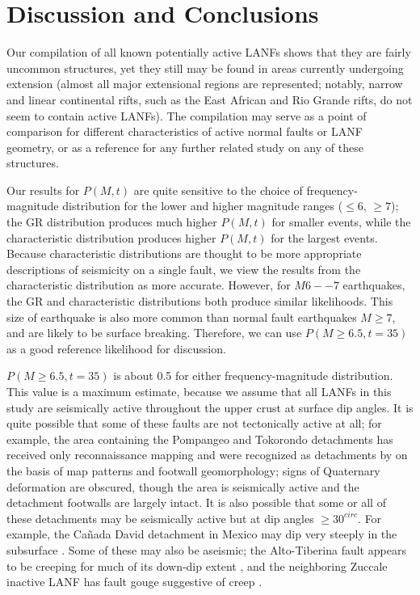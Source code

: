 \documentclass[draft,grl]{AGUTeX}
\begin{document}
\begin{article}
\begin{figure}
\label{fig:all_probs}
\end{figure}

\section{Discussion and Conclusions}

Our compilation of all known potentially active LANFs shows that they 
are fairly uncommon structures, yet they still may be found in areas 
currently undergoing extension (almost all major extensional regions are
represented; notably, narrow and linear continental rifts, such as 
the East African and Rio Grande rifts, do not seem to contain active LANFs).
The compilation may serve as a point of comparison for different
characteristics of active normal faults or LANF geometry, or as a
reference for any further related study on any of these structures.

Our results for $P(M,t)$ are quite sensitive to the choice of frequency-
magnitude distribution for the lower and higher magnitude ranges ($\le 6, \,
\ge 7$); the GR distribution produces much higher $P(M,t)$ for smaller events,
while the characteristic distribution produces higher $P(M,t)$ for the largest
events.  Because characteristic distributions are thought to be more
appropriate descriptions of seismicity on a single fault, we view the results
from the characteristic distribution as more accurate.
However, for $M6--7$ earthquakes, the GR and characteristic 
distributions both produce similar likelihoods.  This size of earthquake is
also more common than normal fault earthquakes $M\ge 7$, and are likely to be
surface breaking.  Therefore, we can use $P(M\ge6.5, t=35)$ as a good reference
likelihood for discussion.

$P(M\ge6.5, t=35)$ is about 0.5 for either frequency-magnitude distribution.
This value is a maximum estimate, because we assume that all LANFs in this
study are seismically active throughout the upper crust at surface dip angles.
It is quite possible that some of these faults are not tectonically active
at all; for example, the area containing the Pompangeo and Tokorondo
detachments has received only reconnaissance mapping
\citep{parkinson1998sulawesi} and were recognized as detachments by
\citet{spencer2011} on the basis of map patterns and footwall geomorphology;
signs of Quaternary deformation are obscured, though the area is seismically
active and the detachment footwalls are largely intact.
It is also possible that some or all of these detachments may be seismically
active but at dip angles $\ge30^{circ}$.  For example, the Ca\~nada David
detachment in Mexico may dip very steeply in the subsurface 
\citep{fletcherspelz2009}.
Some of these may also be aseismic; the Alto-Tiberina fault appears to
be creeping for much of its down-dip extent
\citep{hreinsdottir2009altotib}, and the neighboring Zuccale inactive
LANF has fault gouge suggestive of creep  \citep{collettiniholdsworth2004}.


\end{article}
\end{document}
